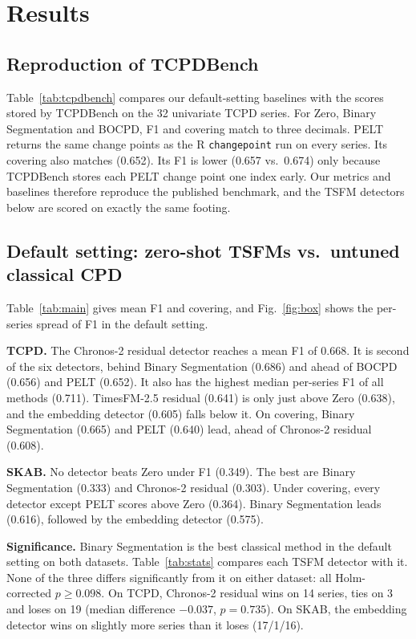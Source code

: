 \section{Results}\label{sec:results}

\subsection{Reproduction of TCPDBench}
Table~\ref{tab:tcpdbench} compares our default-setting baselines with the scores stored by TCPDBench on the 32 univariate TCPD series. For Zero, Binary Segmentation and BOCPD, F1 and covering match to three decimals. PELT returns the same change points as the R \texttt{changepoint} run on every series. Its covering also matches (0.652). Its F1 is lower (0.657 vs.\ 0.674) only because TCPDBench stores each PELT change point one index early. Our metrics and baselines therefore reproduce the published benchmark, and the TSFM detectors below are scored on exactly the same footing.




\subsection{Default setting: zero-shot TSFMs vs.\ untuned classical CPD}
Table~\ref{tab:main} gives mean F1 and covering, and Fig.~\ref{fig:box} shows the per-series spread of F1 in the default setting.

\textbf{TCPD.} The Chronos-2 residual detector reaches a mean F1 of 0.668. It is second of the six detectors, behind Binary Segmentation (0.686) and ahead of BOCPD (0.656) and PELT (0.652). It also has the highest median per-series F1 of all methods (0.711). TimesFM-2.5 residual (0.641) is only just above Zero (0.638), and the embedding detector (0.605) falls below it. On covering, Binary Segmentation (0.665) and PELT (0.640) lead, ahead of Chronos-2 residual (0.608).

\textbf{SKAB.} No detector beats Zero under F1 (0.349). The best are Binary Segmentation (0.333) and Chronos-2 residual (0.303). Under covering, every detector except PELT scores above Zero (0.364). Binary Segmentation leads (0.616), followed by the embedding detector (0.575).

\textbf{Significance.} Binary Segmentation is the best classical method in the default setting on both datasets. Table~\ref{tab:stats} compares each TSFM detector with it. None of the three differs significantly from it on either dataset: all Holm-corrected $p\geq0.098$. On TCPD, Chronos-2 residual wins on 14 series, ties on 3 and loses on 19 (median difference $-0.037$, $p=0.735$). On SKAB, the embedding detector wins on slightly more series than it loses (17/1/16).


